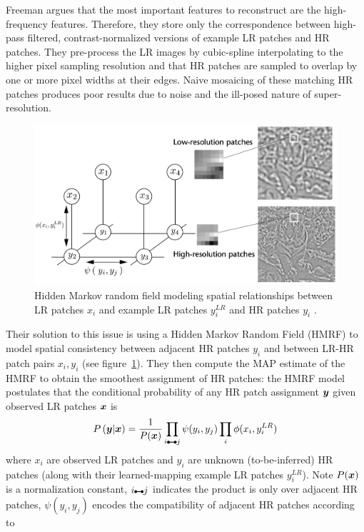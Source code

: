 Freeman \etal \cite{freeman2002example} argues that the most important features to reconstruct are the high-frequency features.
%
Therefore, they store only the correspondence between high-pass filtered, contrast-normalized versions of example LR patches and HR patches.
%
They pre-process the LR images by cubic-spline interpolating to the higher pixel sampling resolution and that HR patches are sampled to overlap by one or more pixel widths at their edges.
%
Naive mosaicing of these matching HR patches produces poor results due to noise and the ill-posed nature of super-resolution.
%
\begin{figure}[!htbp]
    \centering
    \includegraphics[width=\linewidth,keepaspectratio]{figures/classical/mrf.png}
    \caption{Hidden Markov random field modeling spatial relationships between LR patches \(x_i\) and example LR patches \(y_i^{LR}\) and HR patches \(y_i\) \cite{freeman2002example}.}
    \label{fig:mrf}
\end{figure}
Their solution to this issue is using a Hidden Markov Random Field (HMRF) to model spatial consistency between adjacent HR patches \(y_i\) and between LR-HR patch pairs \(x_i, y_i\) (see figure~\ref{fig:mrf}).
%
They then compute the MAP estimate of the HMRF to obtain the smoothest assignment of HR patches: the HMRF model postulates that the conditional probability of any HR patch assignment \(\bm{y}\) given observed LR patches \(\bm{x}\) is
\begin{equation}
    P\left( \by \middle| \bx \right) = \frac{1}{P(\bx)} \prod_{i\ue{} j} \psi(y_i, y_j) \prod_i \phi(x_i, y_i^{LR})
\end{equation}
where \(x_i\) are observed LR patches and \(y_i\) are unknown (to-be-inferred) HR patches (along with their learned-mapping example LR patches \(y_i^{LR}\)).
%
Note \(P(\bm{x})\) is a normalization constant, \(i\ue{} j\) indicates the product is only over adjacent HR patches, \(\psi(y_i, y_j)\) encodes the compatibility of adjacent HR patches according to

